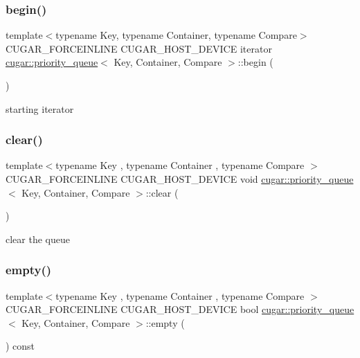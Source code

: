 \subsubsection{\texorpdfstring{begin()}{begin()}\hspace{0.1cm}{\footnotesize\ttfamily [2/2]}}
{\footnotesize\ttfamily template$<$typename Key, typename Container, typename Compare$>$ \\
C\+U\+G\+A\+R\+\_\+\+F\+O\+R\+C\+E\+I\+N\+L\+I\+NE C\+U\+G\+A\+R\+\_\+\+H\+O\+S\+T\+\_\+\+D\+E\+V\+I\+CE iterator \hyperlink{structcugar_1_1priority__queue}{cugar\+::priority\+\_\+queue}$<$ Key, Container, Compare $>$\+::begin (\begin{DoxyParamCaption}{ }\end{DoxyParamCaption})\hspace{0.3cm}{\ttfamily [inline]}}

starting iterator \mbox{\label{structcugar_1_1priority__queue_ae83fdf473503faff06093363f2fbd9de}} 
\subsubsection{\texorpdfstring{clear()}{clear()}}
{\footnotesize\ttfamily template$<$typename Key , typename Container , typename Compare $>$ \\
C\+U\+G\+A\+R\+\_\+\+F\+O\+R\+C\+E\+I\+N\+L\+I\+NE C\+U\+G\+A\+R\+\_\+\+H\+O\+S\+T\+\_\+\+D\+E\+V\+I\+CE void \hyperlink{structcugar_1_1priority__queue}{cugar\+::priority\+\_\+queue}$<$ Key, Container, Compare $>$\+::clear (\begin{DoxyParamCaption}{ }\end{DoxyParamCaption})}

clear the queue \mbox{\label{structcugar_1_1priority__queue_aa7c04643a12d912dfada807743a8c1a8}} 
\subsubsection{\texorpdfstring{empty()}{empty()}}
{\footnotesize\ttfamily template$<$typename Key , typename Container , typename Compare $>$ \\
C\+U\+G\+A\+R\+\_\+\+F\+O\+R\+C\+E\+I\+N\+L\+I\+NE C\+U\+G\+A\+R\+\_\+\+H\+O\+S\+T\+\_\+\+D\+E\+V\+I\+CE bool \hyperlink{structcugar_1_1priority__queue}{cugar\+::priority\+\_\+queue}$<$ Key, Container, Compare $>$\+::empty (\begin{DoxyParamCaption}{ }\end{DoxyParamCaption}) const}

